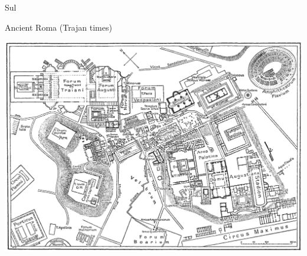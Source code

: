 \documentclass[print,Draft]{faosyb}
\begin{document}
\begin{map}{S}{ul}
\caption{Ancient Roma \newline (Trajan times)}
\label{map:roma}
\includegraphics[width=\chartwidth]{Rome}
\end{map}
\lipsum
\end{document}
